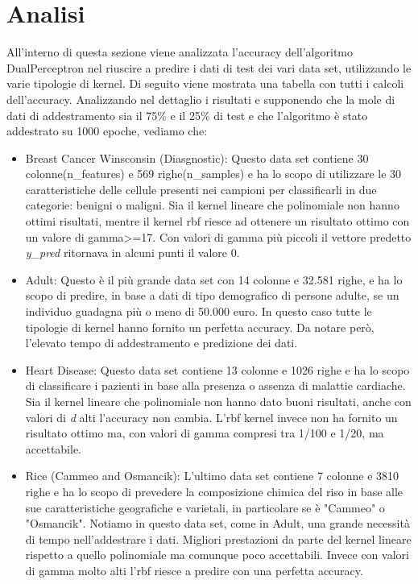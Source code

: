 \documentclass{article}
\begin{document}
	\section{Analisi}
	All'interno di questa sezione viene analizzata l'accuracy dell'algoritmo DualPerceptron nel riuscire a predire i dati di test dei vari data set, utilizzando le varie tipologie di kernel. Di seguito viene mostrata una tabella con tutti i calcoli dell'accuracy.  
	Analizzando nel dettaglio i risultati e supponendo che la mole di dati di addestramento sia il 75\% e il 25\% di test e che l'algoritmo è stato addestrato su 1000 epoche, vediamo che:
	\begin{itemize}
		\item Breast Cancer Winsconsin (Diasgnostic): Questo data set contiene 30 colonne(n\_features) e 569 righe(n\_samples) e ha lo scopo di utilizzare le 30 caratteristiche delle cellule presenti nei campioni per classificarli in due categorie: benigni o maligni. Sia il kernel lineare che polinomiale non hanno ottimi risultati, mentre il kernel rbf riesce ad ottenere un risultato ottimo con un valore di gamma>=17. Con valori di gamma più piccoli il vettore predetto \textit{y\_pred} ritornava in alcuni punti il valore 0.
		\item Adult: Questo è il più grande data set con 14 colonne e 32.581 righe, e ha lo scopo di predire, in base a dati di tipo demografico di persone adulte, se un individuo guadagna più o meno di 50.000 euro. In questo caso tutte le tipologie di kernel hanno fornito un perfetta accuracy. Da notare però, l'elevato tempo di addestramento e predizione dei dati.
		\item Heart Disease: Questo data set contiene 13 colonne e 1026 righe e ha lo scopo di classificare i pazienti in base alla presenza o assenza di malattie cardiache. Sia il kernel lineare che polinomiale non hanno dato buoni risultati, anche con valori di \textit{d} alti l'accuracy non cambia. L'rbf kernel invece non ha fornito un risultato ottimo ma, con valori di gamma compresi tra 1/100 e 1/20, ma accettabile.
		\item Rice (Cammeo and Osmancik): L'ultimo data set contiene 7 colonne e 3810 righe e ha lo scopo di prevedere la composizione chimica del riso in base alle sue caratteristiche geografiche e varietali, in particolare se è "Cammeo" o "Osmancik". Notiamo in questo data set, come in Adult, una grande necessità di tempo nell'addestrare i dati. Migliori prestazioni da parte del kernel lineare rispetto a quello polinomiale ma comunque poco accettabili. Invece con valori di gamma molto alti l'rbf riesce a predire con una perfetta accuracy.
	\end{itemize}
\end{document}
